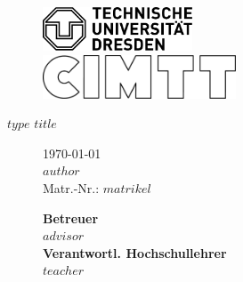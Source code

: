 \documentclass[DIV10, parskip*, headings=big, twopage, 10.5pt, cleardoublepage=plain,
   			bibliography=totoc, liststotoc, BCOR=12mm,
   			pointlessnumbers]{scrbook}
\begin{document}
\begin{titlepage}
\begin{figure}[htbp]
  \begin{minipage}[t][3cm][c]{\textwidth/2+1.7cm}
	
		\includegraphics[height=3.5em]{figures/tud.pdf}  

  \end{minipage}
  \begin{minipage}[t][3cm][c]{\textwidth/2-1.7cm}
	\begin{flushright}  	
  	\includegraphics[height=3.5em]{figures/logo.pdf}
	\end{flushright}
  \end{minipage}
\end{figure}



\vspace{10em}
\large{\textsf{$type$}}
\newline
\Huge{\textbf{\textsf{$title$}}}

\vspace{\fill}

\normalsize 

\begin{flushleft}

\begin{figure}[b]
\centering
\begin{minipage}[b]{\textwidth/2-0.1cm+0.85cm}
\begin{flushleft}
\today\\ \vspace{1em}
$author$\\ \vspace{0.25em}
Matr.-Nr.: $matrikel$
\end{flushleft}
\end{minipage}
\begin{minipage}[b]{\textwidth/2-0.1cm-0.85cm}
\begin{flushleft}
\textbf{\textsf{Betreuer}}\\ \vspace{0.25em}
$advisor$\\
\vspace{1em}
\textbf{\textsf{Verantwortl. Hochschullehrer}}\\ \vspace{0.25em}
$teacher$
\end{flushleft}
\end{minipage}
\end{figure}

\end{flushleft}

\end{titlepage}
\end{document}
